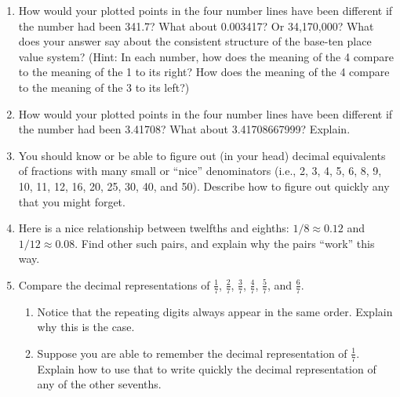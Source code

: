 \begin{problems}
\begin{enumerate}
\vspace{0.8cm}


\vspace{1.2cm}


\vspace{0.4cm}

\item How would your plotted points in the four number lines have been different if the number had been 341.7?  What about 0.003417?  Or 34,170,000?   What does your answer say about the consistent structure of the base-ten place value system?  (Hint:  In each number, how does the meaning of the 4 compare to the meaning of the 1 to its right?   How does the meaning of the 4 compare to the meaning of the 3 to its left?)  

\item How would your plotted points in the four number lines have been different if the number had been 3.41708?  What about 3.41708667999?  Explain.  

\item You should know or be able to figure out (in your head) decimal equivalents of fractions with many small  or ``nice'' denominators (i.e., 2, 3, 4, 5, 6, 8, 9, 10, 11, 12, 16, 20, 25, 30, 40, and 50).  Describe how to figure out quickly any that you might forget.  

\item Here is a nice relationship between twelfths and eighths:  $1/8\approx 0.12$ and $1/12\approx 0.08$.  Find other such pairs, and explain why the pairs ``work'' this way.   

\item Compare the decimal representations of $\frac{1}{7}$, $\frac{2}{7}$, $\frac{3}{7}$, $\frac{4}{7}$, $\frac{5}{7}$, and  $\frac{6}{7}$.
\begin{enumerate}  
\item Notice that the repeating digits always appear in the same order.  Explain why this is the case.
\item Suppose you are able to remember the decimal representation of $\frac{1}{7}$.  Explain how to use that to write quickly the decimal representation of any of the other sevenths.  
\end{enumerate}


\end{enumerate}
\end{problems}

